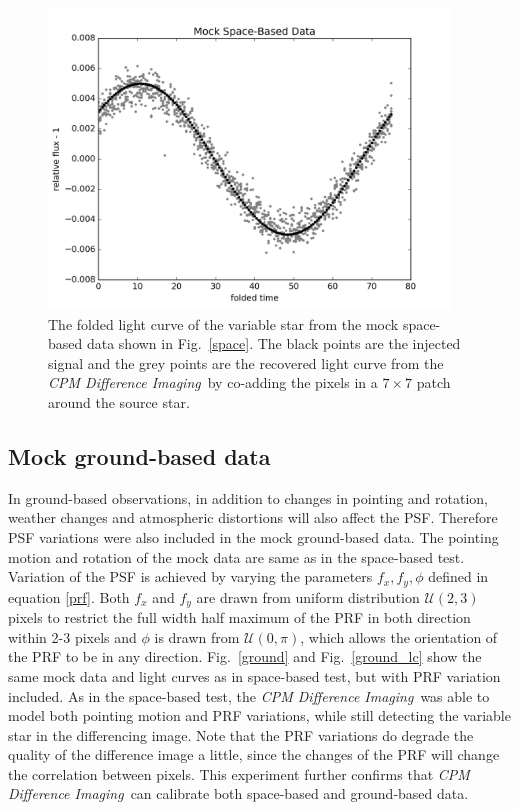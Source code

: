 \documentclass[12pt, preprint]{aastex}
\newcommand{\project}[1]{\textsl{#1}}
\newcommand{\cpmdiff}{\project{CPM Difference Imaging}}
\begin{document}
\begin{figure}[p]
\begin{center}
\includegraphics[width=0.95\textwidth]{f2a}
\end{center}
\caption{
\label{space_lc}
 The folded light curve of the variable star from the mock space-based data shown in Fig.~\ref{space}.
 The black points are the injected signal and the grey points are the recovered light curve from the \cpmdiff\ by co-adding the pixels in a $7\times 7$ patch around the source star.
}
\end{figure}

\subsection{Mock ground-based data}
In ground-based observations, in addition to changes in pointing and rotation, weather changes and atmospheric distortions will also affect the PSF. 
Therefore PSF variations were also included in the mock ground-based data. 
The pointing motion and rotation of the mock data are same as in the space-based test.
Variation of the PSF is achieved by varying the parameters $f_x, f_y, \phi$ defined in equation \ref{prf}.
Both $f_x$ and $f_y$ are drawn from uniform distribution ${\mathcal {U}}(2,3)$ pixels to restrict the full width half maximum of the PRF in both direction within 2-3 pixels and $\phi$ is drawn from ${\mathcal {U}}(0,\pi)$, which allows the orientation of the PRF to be in any direction.
Fig.~\ref{ground} and Fig.~\ref{ground_lc} show the same mock data and light curves as in space-based test, but with PRF variation included.  
As in the space-based test, the \cpmdiff\ was able to model both pointing motion and PRF variations, while still detecting the variable star in the differencing image.
Note that the PRF variations do degrade the quality of the difference image a little, since the changes of the PRF will change the correlation between pixels.
This experiment further confirms that \cpmdiff\ can calibrate both space-based and ground-based data.
\end{document}
